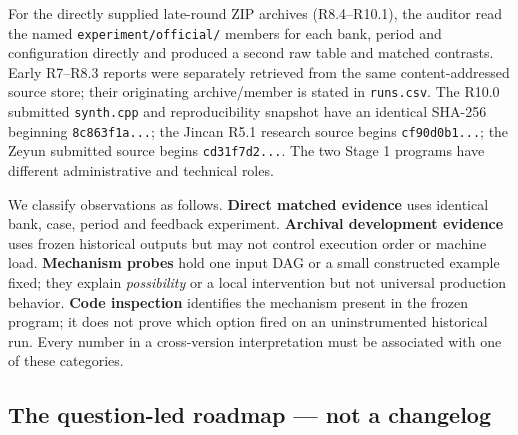 For the directly supplied late-round ZIP archives (R8.4--R10.1), the auditor read the named \texttt{experiment/official/} members for each bank, period and configuration directly and produced a second raw table and matched contrasts. Early R7--R8.3 reports were separately retrieved from the same content-addressed source store; their originating archive/member is stated in \texttt{runs.csv}. The R10.0 submitted \texttt{synth.cpp} and reproducibility snapshot have an identical SHA-256 beginning \texttt{8c863f1a...}; the Jincan R5.1 research source begins \texttt{cf90d0b1...}; the Zeyun submitted source begins \texttt{cd31f7d2...}. The two Stage 1 programs have different administrative and technical roles.

We classify observations as follows. \textbf{Direct matched evidence} uses identical bank, case, period and feedback experiment. \textbf{Archival development evidence} uses frozen historical outputs but may not control execution order or machine load. \textbf{Mechanism probes} hold one input DAG or a small constructed example fixed; they explain \emph{possibility} or a local intervention but not universal production behavior. \textbf{Code inspection} identifies the mechanism present in the frozen program; it does not prove which option fired on an uninstrumented historical run. Every number in a cross-version interpretation must be associated with one of these categories.

\subsection{The question-led roadmap --- not a changelog}\label{the-question-led-roadmap-not-a-changelog}

